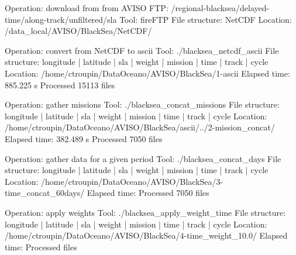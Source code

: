 Operation: download from from AVISO FTP: /regional-blacksea/delayed-time/along-track/unfiltered/sla
Tool: fireFTP
File structure: NetCDF
Location: /data_local/AVISO/BlackSea/NetCDF/

Operation: convert from NetCDF to ascii  
Tool: ./blacksea_netcdf_ascii
File structure: longitude | latitude | sla | weight | mission | time | track | cycle
Location: /home/ctroupin/DataOceano/AVISO/BlackSea/1-ascii 
Elapsed time:  885.225  s
Processed  15113  files

Operation: gather missions
Tool: ./blacksea_concat_missions
File structure: longitude | latitude | sla | weight | mission | time | track | cycle
Location: /home/ctroupin/DataOceano/AVISO/BlackSea/ascii/../2-mission_concat/ 
Elapsed time:  382.489  s
Processed  7050  files
 
Operation: gather data for a given period
Tool: ./blacksea_concat_days
File structure: longitude | latitude | sla | weight | mission | time | track | cycle
Location: /home/ctroupin/DataOceano/AVISO/BlackSea/3-time_concat_60days/
Elapsed time:  
Processed  7050  files

Operation: apply weights
Tool: ./blacksea_apply_weight_time
File structure: longitude | latitude | sla | weight | mission | time | track | cycle
Location: /home/ctroupin/DataOceano/AVISO/BlackSea/4-time_weight_10.0/
Elapsed time: 
Processed    files
 